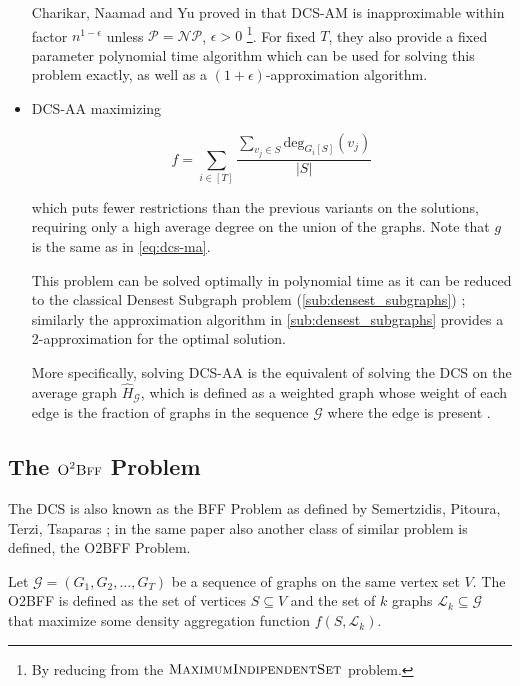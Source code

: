 \begin{itemize}
	      Charikar, Naamad and Yu proved in \cite{charikar2018finding}
	      that \acrshort{DCS}-AM is inapproximable within factor $n^{1-\epsilon} $ unless
	      $\mathcal{P} = \mathcal{NP}  $, $\epsilon > 0$
	      \footnote{By reducing from the
		      $\textsc{MaximumIndipendentSet}$ problem.}. For fixed $T$, they also provide a fixed
	      parameter polynomial time algorithm which can be used for solving
	      this problem exactly, as well as a $(1+\epsilon)$-approximation
	      algorithm.
	\item \acrshort{DCS}-AA maximizing

	      \begin{equation}
		      \label{eq:dcs-aa}
		      f = \sum^{}_{i \in [T]} \frac{\sum^{}_{v_{j} \in S} \text{deg}_{G_i[S]}
		      (v_{j} )}{|S|}
	      \end{equation}

	      which puts fewer restrictions than the previous variants on the
	      solutions, requiring only a high average degree on the union of the
	      graphs. Note that $g$ is the same as in \eqref{eq:dcs-ma}.

	      This problem can be solved optimally in polynomial time as it can be
	      reduced to the classical Densest Subgraph problem
	      (\autoref{sub:densest_subgraphs}) \cite{semertzidis2019finding};
	      similarly the approximation algorithm in
	      \autoref{sub:densest_subgraphs}
	      provides a 2-approximation for the optimal solution.

	      More specifically, solving \acrshort{DCS}-AA is the equivalent of solving
	      the \acrfull{DCS} on the average graph $\hat{H}_{\mathcal{G} }  $,
	      which is defined as a weighted graph whose weight of each edge is the
	      fraction of graphs in the sequence $\mathcal{G} $ where the edge is
	      present \cite{semertzidis2019finding}.
\end{itemize}

\subsection{The $\textsc{O}^{2} \textsc{Bff}$ Problem}%
\label{sub:the_o_2_bff_problem}

The \acrshort{DCS} is also known as the \acrfull{BFF} Problem as defined by Semertzidis, Pitoura, Terzi, Tsaparas
\cite{semertzidis2019finding}; in the same paper also another class of similar
problem is defined, the \acrlong{O2BFF} Problem.

Let $\mathcal{G} = (G_1, G_2, \dots, G_T) $ be a sequence of graphs on the same
vertex set $V$. The \acrfull{O2BFF} is defined as the set of
vertices $S \subseteq V$ and the set of $k$ graphs $\mathcal{L}_{k} \subseteq
	\mathcal{G}  $ that maximize some density aggregation function $f(S,
	\mathcal{L}_{k}) $.

